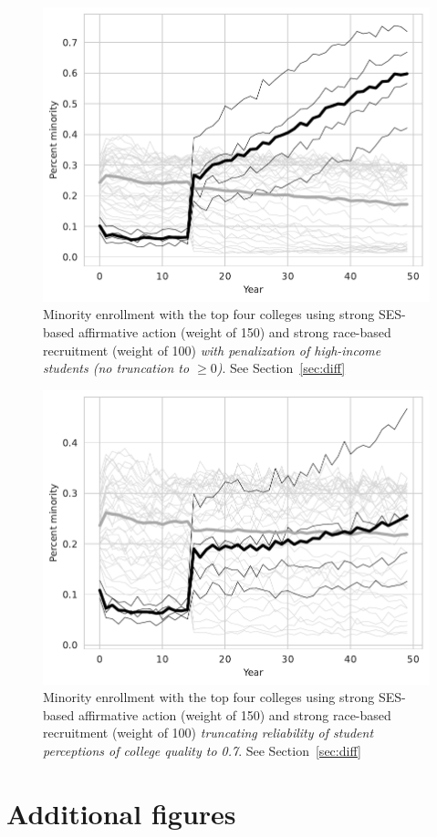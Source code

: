 \begin{appendices}
\begin{figure}[H]
  \centering
  \includegraphics[width=.79\textwidth]{figures/figC4_pen.pdf}
  \caption{Minority enrollment with the top four colleges using strong SES-based affirmative action (weight of 150) and strong race-based recruitment (weight of 100) \emph{with penalization of high-income students (no truncation to $\geq 0$)}. See Section~\ref{sec:diff}}
  \label{fig:c4_pen}
\end{figure}

\begin{figure}[H]
  \centering
  \includegraphics[width=.79\textwidth]{figures/figC4_pq07.pdf}
  \caption{Minority enrollment with the top four colleges using strong SES-based affirmative action (weight of 150) and strong race-based recruitment (weight of 100) \emph{truncating reliability of student perceptions of college quality to 0.7}. See Section~\ref{sec:diff}}
  \label{fig:c4_pq07}
\end{figure}

\section{Additional figures}\label{sec:add}


\end{appendices}
